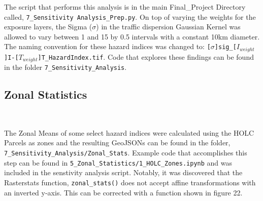 \documentclass[article,12pt]{article}
\numberwithin{equation}{section}
\begin{document}
The script that performs this analysis is in the main Final\_Project Directory called, \texttt{7\_Sensitivity Analysis\_Prep.py}. On top of varying the weights for the exposure layers, the Sigma ($\sigma$) in the traffic dispersion Gaussian Kernel was allowed to vary between 1 and 15 by 0.5 intervals with a constant 10km diameter. The naming convention for these hazard indices was changed to: \newline\newline \texttt{[$\sigma$]sig\_[$I_{weight}$]I-[$T_{weight}$]T\_HazardIndex.tif}. \newline\newline Code that explores these findings can be found in the folder \texttt{7\_Sensitivity\_Analysis}.

\subsection{Zonal Statistics}

\begin{adjustwidth}{-.88in}{-.88in}
	\begin{center}
		\\
		
	\end{center}
\end{adjustwidth}
\vspace{.5in}

The Zonal Means of some select hazard indices were calculated using the HOLC Parcels as zones and the resulting GeoJSONs can be found in the folder, \newline \texttt{7\_Sensitivity\_Analysis/Zonal\_Stats}. Example code that accomplishes this step can be found in \texttt{5\_Zonal\_Statistics/1\_HOLC\_Zones.ipynb} and was included in the senstivity analysis script. Notably, it was discovered that the Rasterstats function, \texttt{zonal\_stats()} does not accept affine transformations with an inverted y-axis. This can be corrected with a function shown in figure 22.
\end{document}
